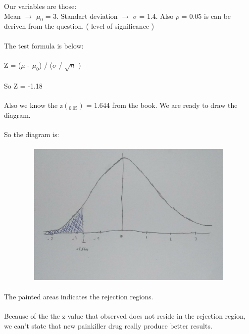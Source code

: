 \documentclass[12pt]{article}
\begin{document}
Our variables are those:\\ Mean $\rightarrow$ $\mu_0$ = 3. Standart deviation $\rightarrow$ $\sigma$ = 1.4. Also $\rho$ = 0.05 is can be deriven from the question. ( level of significance ) \\
\\
The test formula is below:\\
\\
Z = ($\mu$ - $\mu_0$) / ($\sigma$ / $\sqrt{n}$ ) \\
\\
So Z = -1.18\\
\\
Also we know the z$(_0.05)$ = 1.644 from the book. We are ready to draw the diagram.\\
\\
So the diagram is:\\
\\
\includegraphics[width=14cm, height=7cm]{diagram2}\\
\\
The painted areas indicates the rejection regions.\\
\\
Because of the the z value that observed does not reside in the rejection region, we can't state that new painkiller drug really produce better results.\\
\end{document}
